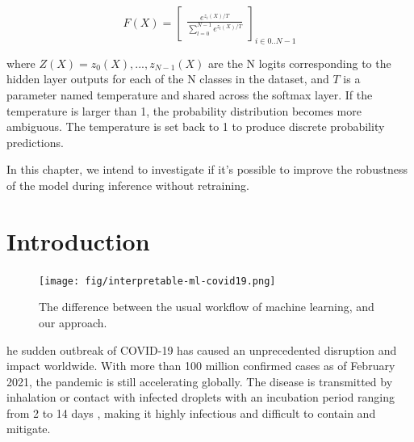 $$F(X)=\begin{bmatrix}
\frac{e^{z_i(X)/T}}{\sum_{l=0}^{N-1}e^{z_l(X)/T}}
\end{bmatrix}_{i\in 0..N-1}$$

where $Z(X)=z_0(X), ..., z_{N-1}(X)$ are the N logits corresponding to the hidden layer outputs for each of the N classes in the dataset, and $T$ is a parameter named temperature and shared across the softmax layer. If the temperature is larger than 1, the probability distribution becomes more ambiguous. The temperature is set back to 1 to produce discrete probability predictions.

In this chapter, we intend to investigate if it's possible to improve the robustness of the model during inference without retraining.

\section{Introduction}


\begin{figure}
\centering
\texttt{[image: fig/interpretable-ml-covid19.png]}
\caption{The difference between the usual workflow of machine learning, and our approach.}
\label{fig:approach}
\end{figure}

he sudden outbreak of COVID-19 has caused an unprecedented disruption and impact worldwide. With more than 100 million confirmed cases as of February 2021, the pandemic is still accelerating globally. The disease is transmitted by inhalation or contact with infected droplets with an incubation period ranging from 2 to 14 days \cite{singhal2020review}, making it highly infectious and difficult to contain and mitigate.

